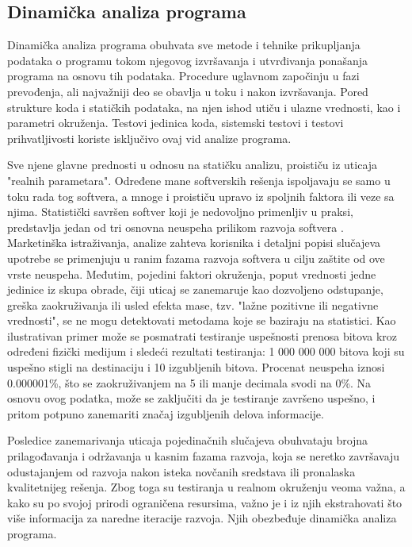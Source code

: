 \documentclass[12pt,oneside]{memoir}
\begin{document}
\subsection{Dinamička analiza programa}

Dinamička analiza programa \cite{Gupta} obuhvata sve metode i tehnike prikupljanja podataka o programu tokom njegovog izvršavanja i utvrđivanja ponašanja programa na osnovu tih podataka. Procedure uglavnom započinju u fazi prevođenja, ali najvažniji deo se obavlja u toku i nakon izvršavanja. Pored strukture koda i statičkih podataka, na njen ishod utiču i ulazne vrednosti, kao i parametri okruženja. Testovi jedinica koda, sistemski testovi i testovi prihvatljivosti koriste isključivo ovaj vid analize programa. 

Sve njene glavne prednosti u odnosu na statičku analizu, proističu iz uticaja "realnih parametara". Određene mane softverskih rešenja ispoljavaju se samo u toku rada tog softvera, a mnoge i proističu upravo iz spoljnih faktora ili veze sa njima. Statistički savršen softver koji je nedovoljno primenljiv u praksi, predstavlja jedan od tri osnovna neuspeha prilikom razvoja softvera \cite{Malkov}. Marketinška istraživanja, analize zahteva korisnika i detaljni popisi slučajeva upotrebe se primenjuju u ranim fazama razvoja softvera u cilju zaštite od ove vrste neuspeha. Međutim, pojedini faktori okruženja, poput vrednosti jedne jedinice iz skupa obrade, čiji uticaj se zanemaruje kao dozvoljeno odstupanje, greška zaokruživanja ili usled efekta mase, tzv. "lažne pozitivne ili negativne vrednosti", se ne mogu detektovati metodama koje se baziraju na statistici. Kao ilustrativan primer može se posmatrati testiranje uspešnosti prenosa bitova kroz određeni fizički medijum i sledeći rezultati testiranja: 1 000 000 000 bitova koji su uspešno stigli na destinaciju i 10 izgubljenih bitova. Procenat neuspeha iznosi 0.000001\%, što se zaokruživanjem na 5 ili manje decimala svodi na 0\%. Na osnovu ovog podatka, može se zaključiti da je testiranje završeno uspešno, i pritom potpuno zanemariti značaj izgubljenih delova informacije.

Posledice zanemarivanja uticaja pojedinačnih slučajeva obuhvataju brojna prilagođavanja i održavanja u kasnim fazama razvoja, koja se neretko završavaju odustajanjem od razvoja nakon isteka novčanih sredstava ili pronalaska kvalitetnijeg rešenja. Zbog toga su testiranja u realnom okruženju veoma važna, a kako su po svojoj prirodi ograničena resursima, važno je i iz njih ekstrahovati što više informacija za naredne iteracije razvoja. Njih obezbeđuje dinamička analiza programa.
\end{document}
